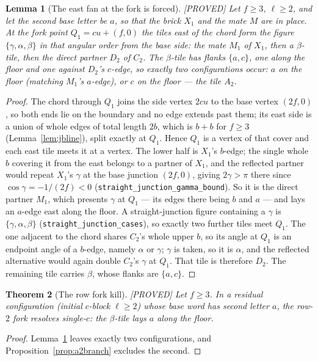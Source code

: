 \documentclass[11pt,reqno]{amsart}
\theoremstyle{plain}
\newtheorem{theorem}{Theorem}
\newtheorem{lemma}[theorem]{Lemma}
\theoremstyle{definition}
\newcommand{\lab}[1]{\hfill\textnormal{\footnotesize\textsc{[#1]}}}
\begin{document}
\begin{lemma}[The east fan at the fork is forced]\label{lem:eastfan}\lab{PROVED}
Let $f\ge3$, $\ell\ge2$, and let the second base letter be $a$, so that the brick $X_1$ and the
mate $M$ are in place. At the fork point $Q_1=cu+(f,0)$ the tiles east of the chord form the
figure $\{\gamma,\alpha,\beta\}$ in that angular order from the base side: the mate $M_1$ of
$X_1$, then a $\beta$-tile, then the direct partner $D_2$ of $C_2$. The $\beta$-tile has flanks
$\{a,c\}$, one along the floor and one against $D_2$'s $c$-edge, so exactly two configurations
occur: $a$ on the floor (matching $M_1$'s $a$-edge), or $c$ on the floor --- the tile $A_2$.
\end{lemma}
\begin{proof}
The chord through $Q_1$ joins the side vertex $2cu$ to the base vertex $(2f,0)$, so both ends lie
on the boundary and no edge extends past them; its east side is a union of whole edges of total
length $2b$, which is $b+b$ for $f\ge3$ (Lemma~\ref{lem:jbline}), split exactly at $Q_1$. Hence
$Q_1$ is a vertex of that cover and each east tile meets it at a vertex. The lower half is
$X_1$'s $b$-edge; the single whole $b$ covering it from the east belongs to a partner of $X_1$,
and the reflected partner would repeat $X_1$'s $\gamma$ at the base junction $(2f,0)$, giving
$2\gamma>\pi$ there since $\cos\gamma=-1/(2f)<0$
(\texttt{straight\_junction\_gamma\_bound}). So it is the direct partner $M_1$, which presents
$\gamma$ at $Q_1$ --- its edges there being $b$ and $a$ --- and lays an $a$-edge east along the
floor. A straight-junction figure containing a $\gamma$ is $\{\gamma,\alpha,\beta\}$
(\texttt{straight\_junction\_cases}), so exactly two further tiles meet $Q_1$. The one adjacent to
the chord shares $C_2$'s whole upper $b$, so its angle at $Q_1$ is an endpoint angle of a
$b$-edge, namely $\alpha$ or $\gamma$; $\gamma$ is taken, so it is $\alpha$, and the reflected
alternative would again double $C_2$'s $\gamma$ at $Q_1$. That tile is therefore $D_2$. The
remaining tile carries $\beta$, whose flanks are $\{a,c\}$.
\end{proof}

\begin{theorem}[The row fork kill]\label{thm:forkkill}\lab{PROVED}
Let $f\ge3$. In a residual configuration (initial $c$-block $\ell\ge2$) whose base word has second
letter $a$, the row-$2$ fork resolves single-$c$: the $\beta$-tile lays $a$ along the floor.
\end{theorem}
\begin{proof}
Lemma~\ref{lem:eastfan} leaves exactly two configurations, and
Proposition~\ref{prop:a2branch} excludes the second.
\end{proof}
\end{document}
